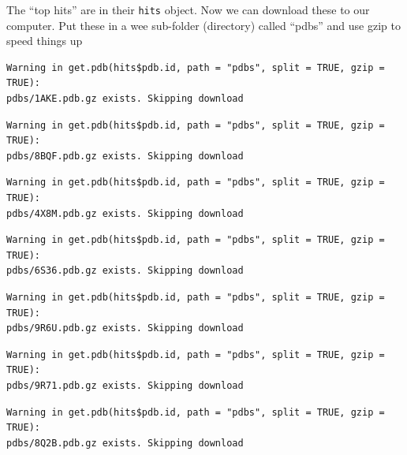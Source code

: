\documentclass[
  letterpaper,
  DIV=11,
  numbers=noendperiod]{scrartcl}
\newenvironment{Shaded}{\begin{snugshade}}{\end{snugshade}}
\newcommand{\AttributeTok}[1]{\textcolor[rgb]{0.40,0.45,0.13}{#1}}
\newcommand{\CommentTok}[1]{\textcolor[rgb]{0.37,0.37,0.37}{#1}}
\newcommand{\ConstantTok}[1]{\textcolor[rgb]{0.56,0.35,0.01}{#1}}
\newcommand{\FunctionTok}[1]{\textcolor[rgb]{0.28,0.35,0.67}{#1}}
\newcommand{\NormalTok}[1]{\textcolor[rgb]{0.00,0.23,0.31}{#1}}
\newcommand{\OtherTok}[1]{\textcolor[rgb]{0.00,0.23,0.31}{#1}}
\newcommand{\SpecialCharTok}[1]{\textcolor[rgb]{0.37,0.37,0.37}{#1}}
\newcommand{\StringTok}[1]{\textcolor[rgb]{0.13,0.47,0.30}{#1}}
\begin{document}
The ``top hits'' are in their \texttt{hits} object. Now we can download
these to our computer. Put these in a wee sub-folder (directory) called
``pdbs'' and use gzip to speed things up

\begin{Shaded}
\end{Shaded}

\begin{verbatim}
Warning in get.pdb(hits$pdb.id, path = "pdbs", split = TRUE, gzip = TRUE):
pdbs/1AKE.pdb.gz exists. Skipping download
\end{verbatim}

\begin{verbatim}
Warning in get.pdb(hits$pdb.id, path = "pdbs", split = TRUE, gzip = TRUE):
pdbs/8BQF.pdb.gz exists. Skipping download
\end{verbatim}

\begin{verbatim}
Warning in get.pdb(hits$pdb.id, path = "pdbs", split = TRUE, gzip = TRUE):
pdbs/4X8M.pdb.gz exists. Skipping download
\end{verbatim}

\begin{verbatim}
Warning in get.pdb(hits$pdb.id, path = "pdbs", split = TRUE, gzip = TRUE):
pdbs/6S36.pdb.gz exists. Skipping download
\end{verbatim}

\begin{verbatim}
Warning in get.pdb(hits$pdb.id, path = "pdbs", split = TRUE, gzip = TRUE):
pdbs/9R6U.pdb.gz exists. Skipping download
\end{verbatim}

\begin{verbatim}
Warning in get.pdb(hits$pdb.id, path = "pdbs", split = TRUE, gzip = TRUE):
pdbs/9R71.pdb.gz exists. Skipping download
\end{verbatim}

\begin{verbatim}
Warning in get.pdb(hits$pdb.id, path = "pdbs", split = TRUE, gzip = TRUE):
pdbs/8Q2B.pdb.gz exists. Skipping download
\end{verbatim}
\end{document}
